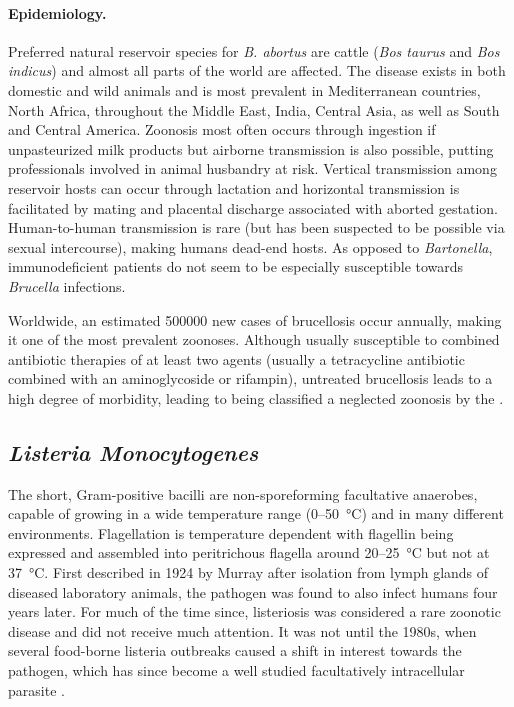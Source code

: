\paragraph{Epidemiology.}
Preferred natural reservoir species for \textit{B. abortus} are cattle (\textit{Bos taurus} and \textit{Bos indicus}) and almost all parts of the world are affected. The disease exists in both domestic and wild animals and is most prevalent in Mediterranean countries, North Africa, throughout the Middle East, India, Central Asia, as well as South and Central America. Zoonosis most often occurs through ingestion if unpasteurized milk products but airborne transmission is also possible, putting professionals involved in animal husbandry at risk. Vertical transmission among reservoir hosts can occur through lactation and horizontal transmission is facilitated by mating and placental discharge associated with aborted gestation. Human-to-human transmission is rare (but has been suspected to be possible via sexual intercourse), making humans dead-end hosts. As opposed to \textit{Bartonella}, immunodeficient patients do not seem to be especially susceptible towards \textit{Brucella} infections.

Worldwide, an estimated 500000 new cases of brucellosis occur annually, making it one of the most prevalent zoonoses. Although usually susceptible to combined antibiotic therapies of at least two agents (usually a tetracycline antibiotic combined with an aminoglycoside or rifampin), untreated brucellosis leads to a high degree of morbidity, leading to being classified a neglected zoonosis by the .

\subsection{\textit{Listeria Monocytogenes}}

The short, Gram-positive bacilli are non-sporeforming facultative anaerobes, capable of growing in a wide temperature range (0--\SI{50}{\celsius}) and in many different environments. Flagellation is temperature dependent with flagellin being expressed and assembled into peritrichous flagella around 20--\SI{25}{\celsius} but not at \SI{37}{\celsius}. First described in 1924 by Murray after isolation from lymph glands of diseased laboratory animals, the pathogen was found to also infect humans four years later. For much of the time since, listeriosis was considered a rare zoonotic disease and did not receive much attention. It was not until the 1980s, when several food-borne listeria outbreaks caused a shift in interest towards the pathogen, which has since become a well studied facultatively intracellular parasite \citep{Farber1991,Cossart2014}.

